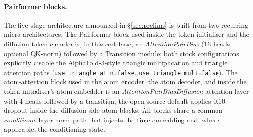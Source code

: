 \documentclass{article}
\theoremstyle{plain}
\theoremstyle{definition}
\theoremstyle{remark}
\begin{document}
\paragraph{Pairformer blocks.} The five-stage architecture announced in \S\ref{sec:prelims} is built from two recurring micro-architectures. The Pairformer block used inside the token initialiser and the diffusion token encoder is, in this codebase, an \emph{AttentionPairBias} ($16$ heads, optional QK-norm) followed by a Transition module; both stock configurations explicitly disable the AlphaFold-3-style triangle multiplication and triangle attention paths (\texttt{use\_triangle\_attn=false}, \texttt{use\_triangle\_mult=false}). The atom-attention block used in the atom encoder, the atom decoder, and inside the token initialiser's atom embedder is an \emph{AttentionPairBiasDiffusion} attention layer with $4$ heads followed by a transition; the open-source default applies $0.10$ dropout inside the diffusion-side atom blocks. All blocks share a common \emph{conditional} layer-norm path that injects the time embedding and, where applicable, the conditioning state.
\end{document}
